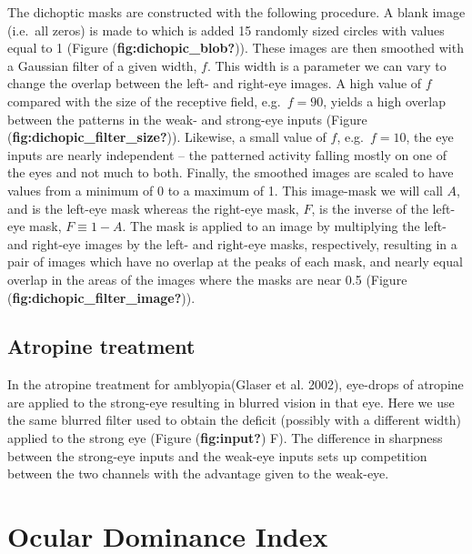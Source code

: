\documentclass[
  letterpaper,
  DIV=11,
  numbers=noendperiod]{scrreprt}
\begin{document}
The dichoptic masks are constructed with the following procedure. A
blank image (i.e.~all zeros) is made to which is added 15 randomly sized
circles with values equal to 1 (Figure (\textbf{fig:dichopic\_blob?})).
These images are then smoothed with a Gaussian filter of a given width,
\(f\). This width is a parameter we can vary to change the overlap
between the left- and right-eye images. A high value of \(f\) compared
with the size of the receptive field, e.g.~\(f=90\), yields a high
overlap between the patterns in the weak- and strong-eye inputs (Figure
(\textbf{fig:dichopic\_filter\_size?})). Likewise, a small value of
\(f\), e.g.~\(f=10\), the eye inputs are nearly independent -- the
patterned activity falling mostly on one of the eyes and not much to
both. Finally, the smoothed images are scaled to have values from a
minimum of 0 to a maximum of 1. This image-mask we will call \(A\), and
is the left-eye mask whereas the right-eye mask, \(F\), is the inverse
of the left-eye mask, \(F\equiv 1-A\). The mask is applied to an image
by multiplying the left- and right-eye images by the left- and right-eye
masks, respectively, resulting in a pair of images which have no overlap
at the peaks of each mask, and nearly equal overlap in the areas of the
images where the masks are near 0.5 (Figure
(\textbf{fig:dichopic\_filter\_image?})).

\hypertarget{atropine-treatment}{%
\section{Atropine treatment}\label{atropine-treatment}}

In the atropine treatment for amblyopia(Glaser et al. 2002), eye-drops
of atropine are applied to the strong-eye resulting in blurred vision in
that eye. Here we use the same blurred filter used to obtain the deficit
(possibly with a different width) applied to the strong eye (Figure
(\textbf{fig:input?}) F). The difference in sharpness between the
strong-eye inputs and the weak-eye inputs sets up competition between
the two channels with the advantage given to the weak-eye.

\hypertarget{ocular-dominance-index}{%
\chapter{Ocular Dominance Index}\label{ocular-dominance-index}}
\end{document}
